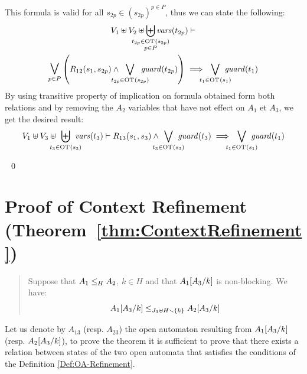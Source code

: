 \documentclass[runningheads]{llncs}
\begin{document}
\begin{enumerate}
This formula is valid for all $s_{2p} \in (s_{2p})^{p\in P}$,  thus we can state the following:
\begin{multline*}
 V_1 \uplus V_2 \uplus \biguplus_{\mathclap{\substack{t_{2p} \in \fOT{s_{2p}}\\ p \in P}}} \fvars{t_{2p}} 
\vdash \\
\operatorname*{\bigsymb{\bigvee}}_{p\in P}\mpar{R_{12}\mpar{s_1, s_{2p}} \wedge \bigvee_\subbox{t_{2p} \in \fOT{s_{2p}}} \fguard{t_{2p}} }  \implies \bigvee_\subbox{t_1 \in \fOT{s_1}} \fguard{t_1}
\end{multline*}
By using transitive property of implication on formula obtained form both relations and by removing the $A_2$ variables that have not effect on   $A_1$ et  $A_3$, we get the desired result:
\begin{multline*}
V_1 \uplus V_3 \uplus \biguplus_\subbox{t_3 \in \fOT{s_3}} \fvars{t_3}
\vdash R_{13}\mpar{s_1,s_3} \wedge \bigvee_\subbox{t_3 \in \fOT{s_3}} \fguard{t_3}
\implies \bigvee_\subbox{t_1 \in \fOT{s_1}} \fguard{t_1}
\end{multline*}

\end{enumerate}

~\qed















\section{Proof of Context Refinement (Theorem~\ref{thm:ContextRefinement})}


\begin{quote}
Suppose that $\wrel{A_1}{A_2}{H}$, \(k \in H\) and that \(A_1\subst{A_3}{k}\) is non-blocking.
We have: \[\wrel{A_1\subst{A_3}{k}}{A_2\subst{A_3}{k}}{J_3 \uplus H \setminus \mbrc{k}}\]
\end{quote}


\proof
Let us denote by $A_{13}$ (resp. $A_{23}$) the open automaton resulting from $A_1\subst{A_3}{k}$ (resp. $A_2\subst{A_3}{k}$),  to prove the theorem it is sufficient to prove that there exists a relation between states of the two open automata that satisfies the conditions of the Definition \ref{Def:OA-Refinement}. 
\end{document}
